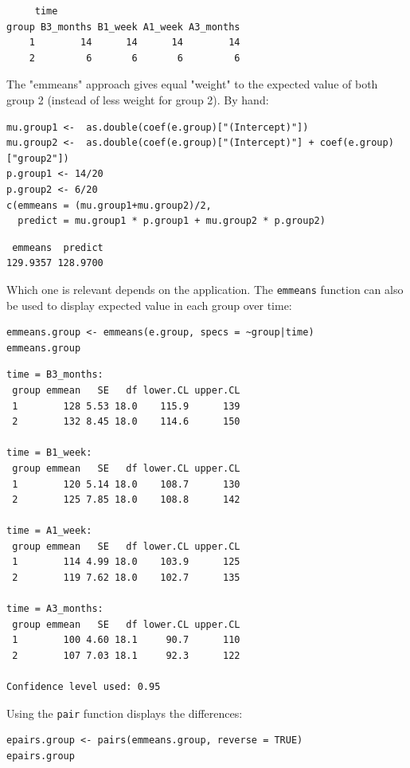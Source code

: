 \documentclass[12pt]{article}
\begin{document}
\begin{verbatim}
     time
group B3_months B1_week A1_week A3_months
    1        14      14      14        14
    2         6       6       6         6
\end{verbatim}


The "emmeans" approach gives equal "weight" to the expected value of
both group 2 (instead of less weight for group 2). By hand:
\lstset{language=r,label= ,caption= ,captionpos=b,numbers=none}
\begin{lstlisting}
mu.group1 <-  as.double(coef(e.group)["(Intercept)"])
mu.group2 <-  as.double(coef(e.group)["(Intercept)"] + coef(e.group)["group2"])
p.group1 <- 14/20
p.group2 <- 6/20
c(emmeans = (mu.group1+mu.group2)/2,
  predict = mu.group1 * p.group1 + mu.group2 * p.group2)
\end{lstlisting}

\begin{verbatim}
 emmeans  predict 
129.9357 128.9700
\end{verbatim}


Which one is relevant depends on the application. The \texttt{emmeans}
function can also be used to display expected value in each group over
time:
\lstset{language=r,label= ,caption= ,captionpos=b,numbers=none}
\begin{lstlisting}
emmeans.group <- emmeans(e.group, specs = ~group|time)
emmeans.group
\end{lstlisting}

\begin{verbatim}
time = B3_months:
 group emmean   SE   df lower.CL upper.CL
 1        128 5.53 18.0    115.9      139
 2        132 8.45 18.0    114.6      150

time = B1_week:
 group emmean   SE   df lower.CL upper.CL
 1        120 5.14 18.0    108.7      130
 2        125 7.85 18.0    108.8      142

time = A1_week:
 group emmean   SE   df lower.CL upper.CL
 1        114 4.99 18.0    103.9      125
 2        119 7.62 18.0    102.7      135

time = A3_months:
 group emmean   SE   df lower.CL upper.CL
 1        100 4.60 18.1     90.7      110
 2        107 7.03 18.1     92.3      122

Confidence level used: 0.95
\end{verbatim}

\clearpage

Using the \texttt{pair} function displays the differences:
\lstset{language=r,label= ,caption= ,captionpos=b,numbers=none}
\begin{lstlisting}
epairs.group <- pairs(emmeans.group, reverse = TRUE)
epairs.group
\end{lstlisting}
\end{document}
